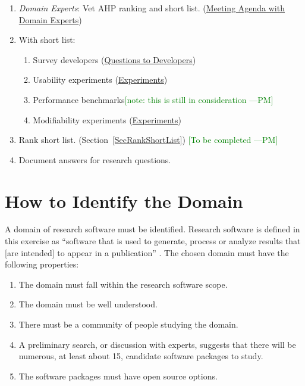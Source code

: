 \documentclass[letterpaper,cleveref]{lipics-v2019}
\newcommand{\authornote}[3]{\textcolor{#1}{[#3 ---#2]}}
\newcommand{\authornote}[3]{}
\newcommand{\wss}[1]{\authornote{blue}{SS}{#1}} %
\newcommand{\pmi}[1]{\authornote{green}{PM}{#1}} %
\theoremstyle{definition}
\begin{document}
\begin{enumerate}
\item \emph{Domain Experts}: Vet AHP ranking and short list. (\href{https://github.com/smiths/AIMSS/blob/master/StateOfPractice/Methodology/Meeting Agenda withmDomainmExperts.pdf}{Meeting Agenda with Domain Experts})
\item With short list:
\begin{enumerate}
\item Survey developers (\href{https://github.com/smiths/AIMSS/blob/master/StateOfPractice/Methodology/Questions to Developers.pdf}{Questions to Developers})
\item Usability experiments (\href{https://github.com/smiths/AIMSS/blob/master/StateOfPractice/Methodology/Experiments.pdf}{Experiments})
\item Performance benchmarks\pmi{note: this is still in consideration}
\item Modifiability experiments (\href{https://github.com/smiths/AIMSS/blob/master/StateOfPractice/Methodology/Experiments.pdf}{Experiments})
\end{enumerate}
\item Rank short list. (Section~\ref{SecRankShortList}) \pmi{To be completed}
\item Document answers for research questions.
\end{enumerate}


\section{How to Identify the Domain} \label{SecIdentifyDomain}
A domain of research software must be identified. Research software is defined in this exercise as ``software that is used to generate, process or analyze results that [are intended] to appear in a publication'' \citep{hettrick2014uk}. The chosen domain must have the following properties:

\begin{enumerate}	
	\item The domain must fall within the research software scope.
	\item The domain must be well understood.
	\item There must be a community of people studying the domain.
	\item A preliminary search, or discussion with experts, suggests that there will be numerous, at least about 15, candidate software packages to study.
	\item The software packages must have open source options. 
\end{enumerate}
\end{document}
